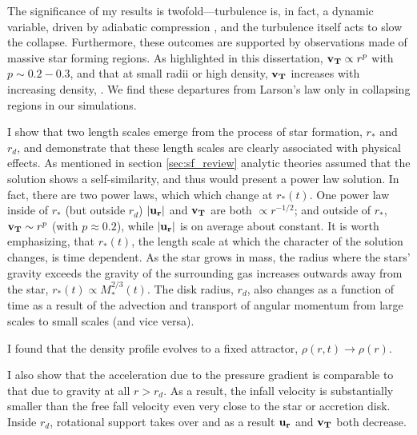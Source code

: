 \documentclass[../dissertation.tex]{subfiles}
\begin{document}
The significance of my results is twofold---turbulence is, in fact, a dynamic variable, driven by adiabatic compression \citep{2012ApJ...750L..31R}, 
and the turbulence itself acts to slow the collapse. 
Furthermore, these outcomes are supported by observations made of massive star forming regions. 
As highlighted in this dissertation,  $\mathbf{v_T} \propto r^p$ with $ p \sim 0.2-0.3$, and that at small radii or high density, $\mathbf{v_T}$  
increases with increasing density, \citep{1997ApJ...476..730P}. 
We find these departures from Larson's law only in collapsing regions in our simulations. 

I show that two length scales emerge from the process of star formation, $r_*$ and $r_d$, and demonstrate that these length scales are clearly associated with physical effects. 
As mentioned in section \ref{sec:sf_review} analytic theories assumed that the solution shows a self-similarity, and thus would present a power law solution.
In fact, there are two power laws, which which change at $r_*(t)$. 
One power law inside of $r_*$ (but outside $r_d$) $|\mathbf{u_r}|$ and  $\mathbf{v_T}$ are both
$\propto r^{-1/2}$; and outside of $r_*$, $\mathbf{v_T} \sim r^{p}$ (with $p\approx0.2$), while $|\mathbf{u_r}|$ is on average about constant. 
It is worth emphasizing, that $r_*(t)$, the length scale at which the character of the solution changes, is time dependent. 
As the star grows in mass, the radius where the stars' gravity exceeds the gravity of the surrounding gas increases outwards away from the star, 
$r_*(t) \propto M_*^{2/3}(t)$.
The disk radius, $r_d$, also changes as a function of time as a result of the advection and 
transport of angular momentum from large scales to small scales (and vice versa).

I found that the density profile evolves to a fixed attractor, $\rho(r,t ) \rightarrow \rho(r)$. 

I also show that the acceleration due to the pressure gradient is comparable to that due to gravity at all $r>r_d$. 
As a result, the infall velocity is substantially smaller than the free fall velocity
even very close to the star or accretion disk. 
Inside $r_d$, rotational support takes over and as a result $\mathbf{u_r}$ and $\mathbf{v_T}$ both decrease.  
\end{document}
